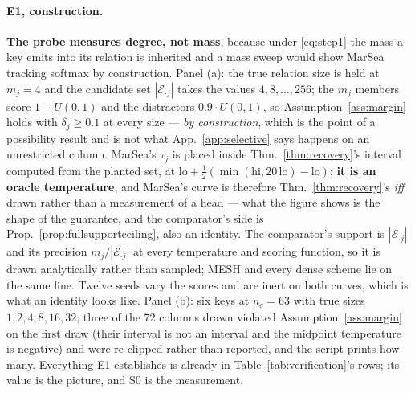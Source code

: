 \documentclass{article}
\begin{document}
\paragraph{E1, construction.} \textbf{The probe measures degree, not mass}, because under
\eqref{eq:step1} the mass a key emits into its relation is inherited and a mass sweep would show
MarSea tracking softmax by construction. Panel (a): the true relation size is held at $m_j=4$ and
the candidate set $|\mathcal{E}_{\cdot j}|$ takes the values $4,8,\dots,256$; the $m_j$ members
score $1+U(0,1)$ and the distractors $0.9\cdot U(0,1)$, so Assumption~\ref{ass:margin} holds with
$\delta_j\ge0.1$ at every size --- \emph{by construction}, which is the point of a possibility
result and is not what App.~\ref{app:selective} says happens on an unrestricted column. MarSea's
$\tau_j$ is placed inside Thm.~\ref{thm:recovery}'s interval computed from the planted set, at
$\mathrm{lo}+\tfrac12(\min(\mathrm{hi},20\,\mathrm{lo})-\mathrm{lo})$; \textbf{it is an oracle
temperature}, and MarSea's curve is therefore Thm.~\ref{thm:recovery}'s \emph{iff} drawn rather
than a measurement of a head --- what the figure shows is the shape of the guarantee, and the
comparator's side is Prop.~\ref{prop:fullsupportceiling}, also an identity. The comparator's
support is $|\mathcal{E}_{\cdot j}|$ and its precision $m_j/|\mathcal{E}_{\cdot j}|$ at every
temperature and scoring function, so it is drawn analytically rather than sampled; MESH and every
dense scheme lie on the same line. Twelve seeds vary the scores and are inert on both curves,
which is what an identity looks like. Panel (b): six keys at $n_q=63$ with true sizes
$1,2,4,8,16,32$; three of the $72$ columns drawn violated Assumption~\ref{ass:margin} on the
first draw (their interval is not an interval and the midpoint temperature is negative) and were
re-clipped rather than reported, and the script prints how many. Everything E1 establishes is
already in Table~\ref{tab:verification}'s rows; its value is the picture, and S0 is the
measurement.
\end{document}
